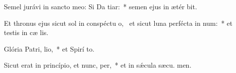 \item Semel jurávi in sancto meo: Si Da tiar:~* semen ejus in ætér bit.
\item Et thronus ejus sicut sol in conspéctu o,~\pscross{} et sicut luna perfécta in num:~* et testis in cæ lis.
\item Glória Patri,  lio,~* et Spirí to.
\item Sicut erat in princípio, et nunc,  per,~* et in sǽcula sæcu. men.
